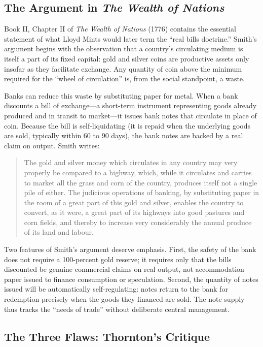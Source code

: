 \documentclass[12pt]{article}
\begin{document}
\subsection{The Argument in \textit{The Wealth of Nations}}

Book II, Chapter II of \textit{The Wealth of Nations} (1776) contains
the essential statement of what Lloyd Mints \citeyearpar{Mints1945}
would later term the ``real bills doctrine.''  Smith's argument begins
with the observation that a country's circulating medium is itself a
part of its fixed capital: gold and silver coins are productive
assets only insofar as they facilitate exchange.  Any quantity of coin
above the minimum required for the ``wheel of circulation'' is,
from the social standpoint, a waste.

Banks can reduce this waste by substituting paper for metal.  When a
bank discounts a bill of exchange---a short-term instrument
representing goods already produced and in transit to market---it
issues bank notes that circulate in place of coin.  Because the bill
is self-liquidating (it is repaid when the underlying goods are sold,
typically within 60 to 90 days), the bank notes are backed by a real
claim on output.  Smith writes:

\begin{quote}
The gold and silver money which circulates in any country may very
properly be compared to a highway, which, while it circulates and
carries to market all the grass and corn of the country, produces
itself not a single pile of either.  The judicious operations of
banking, by substituting paper in the room of a great part of this
gold and silver, enables the country to convert, as it were, a great
part of its highways into good pastures and corn fields, and thereby
to increase very considerably the annual produce of its land and
labour. \citep[Book~II, Ch.~II]{Smith1776}
\end{quote}

Two features of Smith's argument deserve emphasis.  First, the
safety of the bank does not require a 100-percent gold reserve; it
requires only that the bills discounted be genuine commercial claims
on real output, not accommodation paper issued to finance consumption
or speculation.  Second, the quantity of notes issued will be
automatically self-regulating: notes return to the bank for
redemption precisely when the goods they financed are sold.  The
note supply thus tracks the ``needs of trade'' without deliberate
central management.

\subsection{The Three Flaws: Thornton's Critique}
\end{document}
